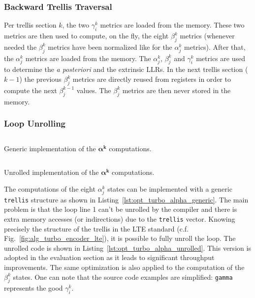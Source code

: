 \subsubsection{Backward Trellis Traversal}

Per trellis section $k$, the two $\gamma_i^k$ metrics are loaded from the
memory. These two metrics are then used to compute, on the fly, the eight
$\beta_j^k$ metrics (whenever needed the $\beta_j^k$ metrics have been
normalized like for the $\alpha_j^k$ metrics). After that, the $\alpha_j^k$
metrics are loaded from the memory. The $\alpha_j^k$, $\beta_j^k$ and
$\gamma_i^k$ metrics are used to determine the \textit{a posteriori} and the
extrinsic LLRs. In the next trellis section ($k-1$) the previous $\beta_j^k$
metrics are directly reused from registers in order to compute the next
$\beta_j^{k-1}$ values. The $\beta_j^k$ metrics are then never stored in the
memory.

\subsubsection{Loop Unrolling}

\begin{listing}[htp]
  \inputminted[frame=lines,linenos]{C++}{main/chapter3/src/turbo/alpha_generic.cpp}
  \caption{Generic implementation of the $\bm{\alpha^k}$ computations.}
  \label{lst:opt_turbo_alpha_generic}
\end{listing}

\begin{listing}[htp]
  \inputminted[frame=lines,linenos]{C++}{main/chapter3/src/turbo/alpha_unrolled.cpp}
  \caption{Unrolled implementation of the $\bm{\alpha^k}$ computations.}
  \label{lst:opt_turbo_alpha_unrolled}
\end{listing}

The computations of the eight $\alpha^k_j$ states can be implemented with
a generic \verb|trellis| structure as shown in
Listing~\ref{lst:opt_turbo_alpha_generic}. The main problem is that the loop
line 1 can't be unrolled by the compiler and there is extra memory accesses (or
indirections) due to the \verb|trellis| vector. Knowing precisely the structure
of the trellis in the LTE standard (c.f. Fig.~\ref{fig:alg_turbo_encoder_lte}),
it is possible to fully unroll the loop. The unrolled code is shown in
Listing~\ref{lst:opt_turbo_alpha_unrolled}. This version is adopted in
the evaluation section as it leads to significant throughput improvements.
The same optimization is also applied to the computation of the $\beta^k_j$
states. One can note that the source code examples are simplified: \verb|gamma|
represents the good $\gamma^k_i$.


